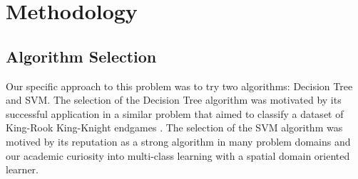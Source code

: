 \documentclass[fleqn]{article}
\begin{document}
%
%
%
%
\section{Methodology}
\label{sec:Methodology}

\subsection{Algorithm Selection}
\label{subsec:Algorithm}
Our specific approach to this problem was to try two algorithms: Decision Tree and SVM. The selection of the Decision Tree algorithm was motivated by its successful application in a similar problem that aimed to classify a dataset of King-Rook King-Knight endgames \cite{Quinlan:83}. The selection of the SVM algorithm was motived by its reputation as a strong algorithm in many problem domains and our academic curiosity into multi-class learning with a spatial domain oriented learner.
%
\end{document}
